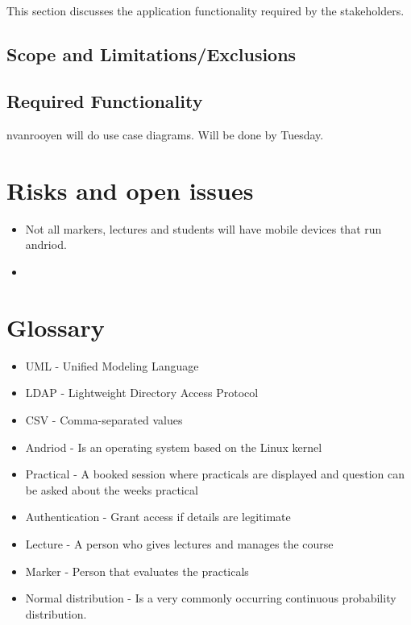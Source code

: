 \documentclass[12pt,a4paper]{article}
\begin{document}
\paragraph{}
This section discusses the application functionality required by the stakeholders.
\subsection{Scope and Limitations/Exclusions}
\subsection{Required Functionality}
nvanrooyen will do use case diagrams. Will be done by Tuesday.
\section{Risks and open issues}
\begin{itemize}
\item Not all markers, lectures and students will have mobile devices that run andriod.
\item 
\end{itemize}
\section{Glossary}
\begin{itemize}
\item UML - Unified Modeling Language
\item LDAP - Lightweight Directory Access Protocol
\item CSV - Comma-separated values
\item Andriod - Is an operating system based on the Linux kernel
\item Practical - A booked session where practicals are displayed and question can be asked about the weeks practical
\item Authentication - Grant access if details are legitimate
\item Lecture - A person who gives lectures and manages the course
\item Marker - Person that evaluates the practicals
\item Normal distribution - Is a very commonly occurring continuous probability distribution.
\end{itemize}
\end{document}

